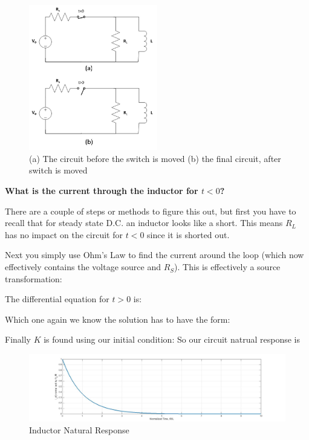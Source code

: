 \documentclass{handout}
\begin{document}
\begin{figure} [h!]
\centering
\includegraphics[width=0.5\textwidth]{DischargingInductorCircuit.jpg}
\caption{(a) The circuit before the switch is moved (b) the final circuit, after switch is moved}
\label{fig: DischargingInductorCircuit}
\end{figure}

\textbf{What is the current through the inductor for $t<0$?}

There are a couple of steps or methods to figure this out, but first you have to recall that for steady state D.C. an inductor looks like a short.  This means $R_L$ has no impact on the circuit for $t<0$ since it is shorted out.

Next you simply use Ohm's Law to find the current around the loop (which now effectively contains the voltage source and $R_S$).  This is effectively a source transformation:

The differential equation for $t>0$ is:
\soln{0.5in}{
\[
\frac{\partial i_L(t)}{\partial t} + \frac{R_L}{L}  i_L(t)=0
\]
}

Which one again we know the solution has to have the form:

Finally $K$ is found using our initial condition:
So our circuit natrual response is
\begin{figure} [h!]
\centering
\includegraphics[width=1\textwidth]{InductorNaturalResponse.jpg}
\caption{Inductor Natural Response}
\label{fig: InductorNaturalResponse}
\end{figure}
\end{document}
